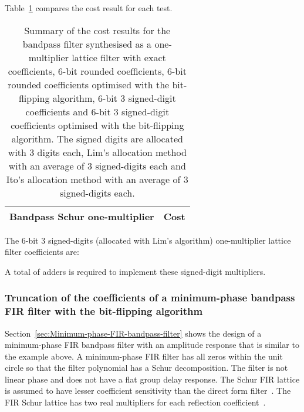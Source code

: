\documentclass[a4paper,twoside,10pt,english]{report}
\begin{document}
Table~\ref{tab:bitflip-bandpass-OneM-lattice-cost-summary} compares the cost
result for each test. 
\begin{table}[htb]
\centering
\begin{threeparttable}
\begin{tabular}{lr}  \\ \toprule
Bandpass Schur one-multiplier & Cost \\ \midrule

\bottomrule
\end{tabular}
\end{threeparttable}
\caption[Summary of cost results for the one-multiplier bandpass
filter bit-flipping algorithm example]
{Summary of the cost results for the bandpass 
filter synthesised as a one-multiplier lattice filter with exact 
coefficients, 6-bit rounded coefficients, 6-bit rounded coefficients 
optimised with the bit-flipping algorithm, 6-bit 3 signed-digit coefficients
and 6-bit 3 signed-digit coefficients optimised with the bit-flipping 
algorithm. The signed digits are allocated with 3 digits each, Lim's allocation
method with an average of 3 signed-digits each and Ito's allocation method
with an average of 3 signed-digits each.}
\label{tab:bitflip-bandpass-OneM-lattice-cost-summary}
\end{table}

The 6-bit 3 signed-digits (allocated with Lim's algorithm) one-multiplier 
lattice filter coefficients are:
\begin{small}


\end{small}
A total of  adders is
required to implement these signed-digit multipliers.
\subsubsection{Truncation of the coefficients of a minimum-phase bandpass FIR filter with the bit-flipping algorithm}
Section~\ref{sec:Minimum-phase-FIR-bandpass-filter} shows the design of
a minimum-phase FIR bandpass filter with an amplitude response that is similar
to the example above. A minimum-phase FIR filter has all zeros within the unit
circle so that the filter polynomial has a Schur decomposition. The filter is 
not linear phase and does not have a flat group delay response. The Schur FIR
lattice is assumed to have lesser coefficient sensitivity than 
the direct form filter~\cite{Vaidyanathan_PassiveCascadedLatticeFIR}. The FIR 
Schur lattice has two real multipliers for each reflection 
coefficient~\cite{DogonataVaidyanathan_OneMultiplierLatticeFIR}.
\end{document}
